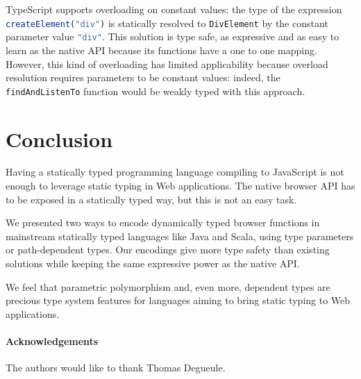 \documentclass{llncs}
\newcommand{\jscode}[1]{\lstinline[language=JavaScript]|#1|}
\begin{document}
TypeScript supports overloading on constant values: the type of the expression \jscode{createElement("div")} is statically resolved to \jscode{DivElement} by the constant parameter value \jscode{"div"}. This solution is type safe, as expressive and as easy to learn as the native API because its functions have a one to one mapping. However, this kind of overloading has limited applicability because overload resolution requires parameters to be constant values: indeed, the \jscode{findAndListenTo} function would be weakly typed with this approach.

\section{Conclusion}
\label{sec-conclusion}

Having a statically typed programming language compiling to JavaScript is not enough to leverage static typing in Web applications. The native browser API has to be exposed in a statically typed way, but this is not an easy task.

We presented two ways to encode dynamically typed browser functions in mainstream statically typed languages like Java and Scala, using type parameters or path-dependent types. Our encodings give more type safety than existing solutions while keeping the same expressive power as the native API.

We feel that parametric polymorphism and, even more, dependent types are precious type system features for languages aiming to bring static typing to Web applications.

\paragraph{Acknowledgements} The authors would like to thank Thomas Degueule.



\end{document}
